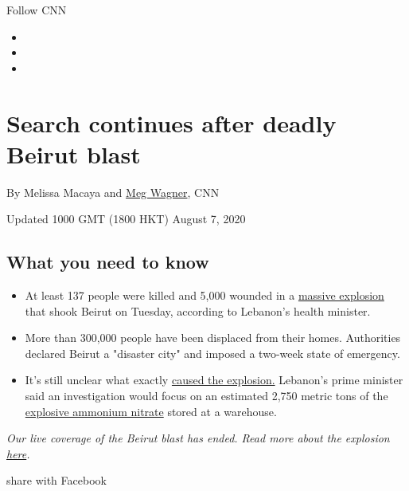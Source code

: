 Follow CNN

\begin{itemize}
\item
\item
\item
\end{itemize}

\hypertarget{search-continues-after-deadly-beirut-blast}{%
\section{Search continues after deadly Beirut
blast}\label{search-continues-after-deadly-beirut-blast}}

By Melissa Macaya and \href{/profiles/meg-wagner}{Meg Wagner}, CNN

Updated 1000 GMT (1800 HKT) August 7, 2020

\hypertarget{what-you-need-to-know}{%
\subsection{What you need to know}\label{what-you-need-to-know}}

\begin{itemize}
\tightlist
\item
  At least 137 people were killed and 5,000 wounded in a
  \href{https://www.cnn.com/2020/08/05/middleeast/beirut-port-explosion-ammonium-nitrate-intl-hnk/index.html}{massive
  explosion} that shook Beirut on Tuesday, according to Lebanon's health
  minister.
\item
  More than 300,000 people have been displaced from their homes.
  Authorities declared Beirut a "disaster city" and imposed a two-week
  state of emergency.
\item
  It's still unclear what exactly
  \href{https://www.cnn.com/2020/08/05/middleeast/beirut-blast-explainer-intl-hnk/index.html}{caused
  the explosion.} Lebanon's prime minister said an investigation would
  focus on an estimated 2,750 metric tons of the
  \href{https://www.cnn.com/2020/08/05/europe/lebanon-russian-ship-blast-intl/index.html}{explosive
  ammonium nitrate} stored at a warehouse.
\end{itemize}

\emph{Our live coverage of the Beirut blast has ended. Read more about
the explosion}
\href{https://www.cnn.com/2020/08/06/middleeast/beirut-explosion-anger-intl-hnk/index.html}{\emph{here}}\emph{.}

share with Facebook

